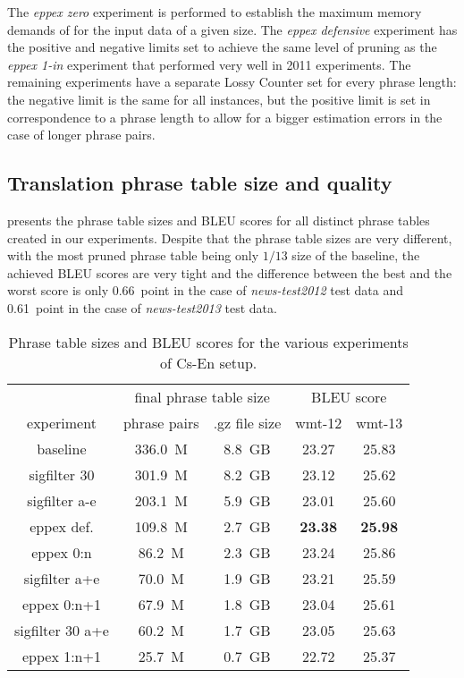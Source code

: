 The \emph{eppex zero} experiment is performed to establish the maximum memory demands of \eppex{}
for the input data of a given size.
The \emph{eppex defensive} experiment has the positive and negative limits set to achieve the same
level of pruning as the \emph{eppex 1-in} experiment that performed very well in 2011 experiments.
The remaining \eppex{} experiments have a separate Lossy Counter set for every phrase length:
the negative limit is the same for all instances, but the positive limit is set in correspondence
to a phrase length to allow for a bigger estimation errors in the case of longer phrase pairs.

\subsection{Translation phrase table size and quality}

 presents the phrase table sizes and BLEU scores for all
distinct phrase tables created in our experiments.
Despite that the phrase table sizes are very different, with the most pruned phrase table being
only $1/13$ size of the baseline, the achieved BLEU scores are very tight and the difference
between the best and the worst score is only 0.66~point in the case of \emph{news-test2012} test data
and 0.61~point in the case of \emph{news-test2013} test data.

\begin{table}[ht]
\centering
\begin{tabular}{ | c | c c | c c | }
\hline
 & \multicolumn{2}{|c|}{final phrase table size} & \multicolumn{2}{|c|}{BLEU score} \\
experiment & phrase pairs & .gz file size & wmt-12 & wmt-13 \\
\hline
\hline
baseline          & 336.0~M & 8.8~GB & 23.27 & 25.83 \\
sigfilter 30      & 301.9~M & 8.2~GB & 23.12 & 25.62 \\
sigfilter a-e     & 203.1~M & 5.9~GB & 23.01 & 25.60 \\
eppex def.        & 109.8~M & 2.7~GB & \textbf{23.38} & \textbf{25.98} \\
eppex 0:n         &  86.2~M & 2.3~GB & 23.24 & 25.86 \\
sigfilter a+e     &  70.0~M & 1.9~GB & 23.21 & 25.59 \\
eppex 0:n+1       &  67.9~M & 1.8~GB & 23.04 & 25.61 \\
sigfilter 30 a+e  &  60.2~M & 1.7~GB & 23.05 & 25.63 \\
eppex 1:n+1       &  25.7~M & 0.7~GB & 22.72 & 25.37 \\
\hline
\end{tabular}
\caption{\label{cs-en-wmt13-pt-size-and-bleu}
Phrase table sizes and BLEU scores for the various experiments of Cs-En setup.}
\end{table}

